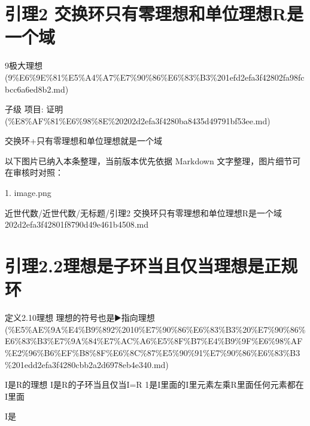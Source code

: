 \section*{引理2 交换环只有零理想和单位理想R是一个域}

\begin{note}[来源上级主题]

9极大理想 (9\%E6\%9E\%81\%E5\%A4\%A7\%E7\%90\%86\%E6\%83\%B3\%201efd2efa3f42802fa98fcbcc6a6ed8b2.md)

\end{note}

\begin{lemma}[引理2 交换环只有零理想和单位理想R是一个域]

子级 项目: 证明 (\%E8\%AF\%81\%E6\%98\%8E\%20202d2efa3f4280ba8435d49791bf53ee.md)

交换环+只有零理想和单位理想就是一个域

\end{lemma}

\begin{note}[关联图片]
以下图片已纳入本条整理，当前版本优先依据 Markdown 文字整理，图片细节可在审核时对照：

1. image.png\\

\end{note}

\begin{note}[来源路径]

近世代数/近世代数/无标题/引理2 交换环只有零理想和单位理想R是一个域 202d2efa3f42801f8790d49e461b4508.md

\end{note}

\section*{引理2.2理想是子环当且仅当理想是正规环}

\begin{note}[来源上级主题]

定义2.10理想 理想的符号也是▶️指向理想 (\%E5\%AE\%9A\%E4\%B9\%892\%2010\%E7\%90\%86\%E6\%83\%B3\%20\%E7\%90\%86\%E6\%83\%B3\%E7\%9A\%84\%E7\%AC\%A6\%E5\%8F\%B7\%E4\%B9\%9F\%E6\%98\%AF\%E2\%96\%B6\%EF\%B8\%8F\%E6\%8C\%87\%E5\%90\%91\%E7\%90\%86\%E6\%83\%B3\%201edd2efa3f4280cbb2a2d6978eb4e340.md)

\end{note}

\begin{lemma}[引理2.2理想是子环当且仅当理想是正规环]

I是R的理想 I是R的子环当且仅当I=R 1是I里面的I里元素左乘R里面任何元素都在I里面

I是

\end{lemma}

